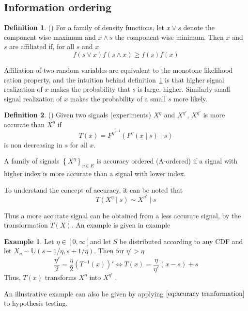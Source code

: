 \documentclass[10pt,a4paper]{article} %
\theoremstyle{definition}
\newtheorem{defn}{Definition}[section]
\newtheorem{example}{Example}[section]
\theoremstyle{remark}
\begin{document}

\subsection{Information ordering}

\begin{defn}
\label{def:afflilation} (\citet{Milgrom1982}) For a family of density
functions, let $x\lor s$ denote the component wise maximum and $x\land s$
the component wise minimum. Then $x$ and $s$ are affiliated if,
for all $s$ and $x$
\[
f(s\lor x)f(s\land x)\ge f(s)f(x)
\]
\end{defn}

Affiliation of two random variables are equivalent to the monotone
likelihood ration property, and the intuition behind definition~\ref{def:afflilation}
is that higher signal realization of $x$ makes the probability that
$s$ is large, higher. Similarly small signal realization of $x$
makes the probability of a small $s$ more likely.

\begin{defn}\label{def:accuracy}
(\citet{Persico2000}) Given two signals
(experiments) $X^{\eta}$ and $X^{\eta'}$, $X^{\eta'}$ is more accurate
than $X^{\eta}$ if
\begin{equation}
T(x)=F^{\eta'^{-1}}(F^{\eta}(x\mid s)\mid s)\label{eq:acuracy tranformation}
\end{equation}
 is non decreasing in $s$ for all $x$.

A family of signals $\left\{ X^{\eta}\right\} _{\eta\in E}$ is accuracy
ordered (A-ordered) if a signal with higher index is more accurate
than a signal with lower index.
\end{defn}

To understand the concept of accuracy, it can be noted that
\[
T(X^{\eta}\mid s)\sim X^{\eta'}\mid s
\]

Thus a more accurate signal can be obtained from a less accurate signal,
by the transformation $T(X)$. An example is given in example

\begin{example}
Let  $\eta\in[0,\infty]$and let $S$ be distributed according to
any CDF and let $X_{\eta}\sim\mathbb{U}(s-1/\eta,s+1/\eta)$. Then
for $\eta'>\eta$
\[
\frac{\eta'}{2}=\frac{\eta}{2}\left(T^{-1}(x)\right)'\Leftrightarrow T(x)=\frac{\eta}{\eta'}(x-s)+s
\]
 Thus, $T(x)$ transforms $X^{\eta}$ into $X^{\eta'}$ \citep{Persico1996}.
\end{example}
An illustrative example can also be given by applying $\eqref{eq:acuracy tranformation}$
to hypothesis testing.
\end{document}
